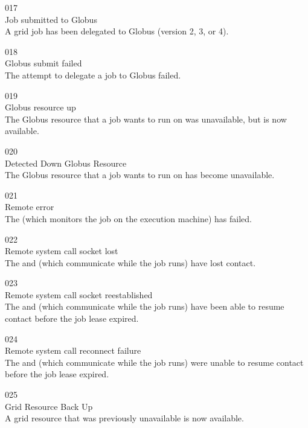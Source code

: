 \noindent{} 017 \\
 Job submitted to Globus \\
 A grid job has been delegated to Globus
(version 2, 3, or 4).

\noindent{} 018 \\
 Globus submit failed \\
 The attempt to delegate a job to Globus
failed. 

\noindent{} 019 \\
 Globus resource up \\
 The Globus resource that a job wants to run
on was unavailable, but is now available.

\noindent{} 020 \\
 Detected Down Globus Resource \\
 The Globus resource that a job wants to run
on has become unavailable. 

\noindent{} 021 \\
 Remote error \\
 The  (which monitors the job
on the execution machine) has failed.

\noindent{} 022 \\
 Remote system call socket lost \\
 The  and 
(which communicate while the job runs) have lost contact.

\noindent{} 023 \\
 Remote system call socket reestablished \\
 The  and 
(which communicate while the job runs) have been able to resume
contact before the job lease expired.

\noindent{} 024 \\
 Remote system call reconnect failure \\
 The  and 
(which communicate while the job runs) were unable to resume
contact before the job lease expired.

\noindent{} 025 \\
 Grid Resource Back Up \\
 A grid resource that was previously
unavailable is now available.

